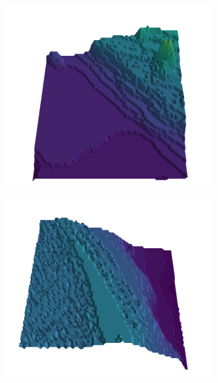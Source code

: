 \documentclass[../document.tex]{subfiles}
\begin{document}
\begin{figure}[H]
    \begin{subfigure}[b]{0.19\textwidth}
        \includegraphics[width=\linewidth]{../img/5/quarry/false_negative//patch-3d-majavi-colormap-0.png}
    \end{subfigure}
    \begin{subfigure}[b]{0.19\textwidth}
        \includegraphics[width=\linewidth]{../img/5/quarry/false_negative//patch-3d-majavi-colormap-1.png}
    \end{subfigure}  

\end{figure}
\end{document}
